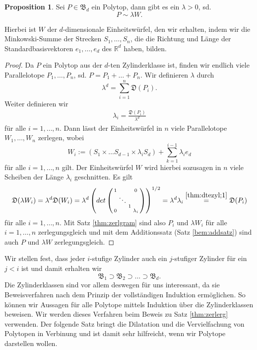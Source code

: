 \documentclass[11pt,titlepage]{article}
\newcommand{\setR}{\mathbb{R}}
\theoremstyle{definition}
\newtheorem{proposition}[theorem]{Proposition}
\theoremstyle{remark}
\begin{document}
	\begin{proposition} \label{bem:dteZylinderklasse}
		Sei $P\in\mathfrak{B}_d$ ein Polytop, dann gibt es ein $\lambda>0$, sd. 
		\[P\sim \lambda W.\] 
	\end{proposition}
	
	Hierbei ist $W$ der $d$-dimensionale Einheitswürfel, den wir erhalten, 
	indem wir die Minkowski-Summe der Strecken $S_1,\ldots,S_n$, 
	die die Richtung und Länge der Standardbasisvektoren $e_1,\ldots, e_d$ 
	des $\setR^d$ haben, bilden.
	
	\begin{proof}
		Da $P$ ein Polytop aus der $d$-ten Zylinderklasse ist, finden 
		wir endlich viele Parallelotope $P_1,\ldots, P_n$, sd. 
		$P=P_1+\ldots+P_n$. Wir definieren $\lambda$ durch 
		\[\lambda^d =\sum_{i=1}^n \mathfrak{D}(P_i).\]
		Weiter definieren wir 
		\begin{align}
			\lambda_i =\frac{\mathfrak{D}(P_i)}{\lambda^d} \label{thm:dtezyl;1}
		\end{align}
		für alle $i=1,\ldots,n$. Dann lässt der Einheitswürfel in $n$ viele 
		Parallelotope $W_1,\ldots,W_n$ zerlegen, wobei
		\[W_i:=(S_1\times\ldots S_{d-1}\times \lambda_i S_d)+
		\sum_{k=1}^{i-1} \lambda_i e_d\]
		für alle $i=1,\ldots,n$ gilt. Der Einheitswürfel $W$ wird hierbei 
		sozusagen in $n$ viele Scheiben der Länge $\lambda_i$ geschnitten. 
		Es gilt 
		\[\mathfrak{D}(\lambda W_i)=\lambda^d \mathfrak{D}(W_i)=
		\lambda^d \left(det \left(\begin{smallmatrix}
		1 & \ &\ &0 \\
		\ &\ddots &\ &\ \\
		\ & \ &  1 &\ \\
		0 & \ & \ & \lambda_i
		\end{smallmatrix}\right)\right)^{1/2}=\lambda^d \lambda_i\overset{\ref{thm:dtezyl;1}}{=}\mathfrak{D}(P_i)\]
		für alle $i=1,\ldots,n$. Mit Satz \ref{thm:zerlgram} 
		sind also $P_i$ und $\lambda W_i$ für alle $i=1,\ldots,n$ zerlegungsgleich 
		und mit dem Additionssatz (Satz \ref{bem:addsatz}) 
		sind auch $P$ und $\lambda W$ zerlegungsgleich.
	\end{proof}
	
	Wir stellen fest, dass jeder $i$-stufige Zylinder auch ein $j$-stufiger 
	Zylinder für ein $j<i$ ist und damit erhalten wir
	\[\mathfrak{B}_1\supset \mathfrak{B}_2\supset \ldots\supset\mathfrak{B}_d.\]
	Die Zylinderklassen sind vor allem deswegen für uns interessant, da sie 
	Beweisverfahren nach dem Prinzip der vollständigen Induktion ermöglichen. 
	So können wir Aussagen für alle Polytope mittels Induktion über die 
	Zylinderklassen beweisen. Wir werden dieses Verfahren beim Beweis zu Satz 
	\ref{thm:zerlerg} verwenden. Der folgende Satz bringt die Dilatation 
	und die Vervielfachung von Polytopen in Verbinung und ist damit sehr 
	hilfreicht, wenn wir Polytope darstellen wollen.
	
\end{document}
